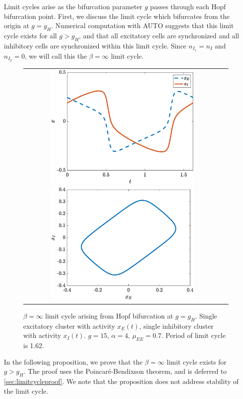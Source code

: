 \documentclass[reqno]{siamonline190516}
\begin{document}
Limit cycles arise as the bifurcation parameter $g$ passes through each Hopf bifurcation point. First, we discuss the limit cycle which bifurcates from the origin at $g = g_H$. Numerical computation with AUTO suggests that this limit cycle exists for all $g > g_H$, and that all excitatory cells are synchronized and all inhibitory cells are synchronized within this limit cycle. Since $n_{I_1} = n_I$ and $n_{I_2} = 0$, we will call this the $\beta=\infty$ limit cycle. 
\begin{figure}
    \centering
    \begin{tabular}{cc}
    \includegraphics[width=7.85cm]{images/limitcycle1.eps}
    \includegraphics[width=7.85cm]{images/limitcycle2.eps}
    \end{tabular}
    \caption{$\beta = \infty$ limit cycle arising from Hopf bifurcation at $g = g_H$. Single excitatory cluster with activity $x_E(t)$, single inhibitory cluster with activity $x_I(t)$. $g = 15$, $\alpha = 4$, $\mu_{EE}= 0.7$. Period of limit cycle is 1.62.} 
    \label{fig:limitcycleorigin}
\end{figure}

In the following proposition, we prove that the $\beta=\infty$ limit cycle exists for $g > g_H$. The proof uses the Poincar\'e-Bendixson theorem, and is deferred to \cref{sec:limitcycleproof}. We note that the proposition does not address stability of the limit cycle.
\end{document}
